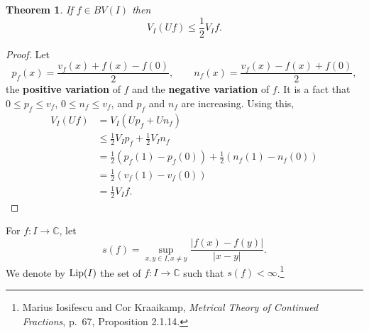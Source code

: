 \documentclass{article}
\newcommand{\Lip}{\ensuremath\mathrm{Lip}}
\newtheorem{theorem}{Theorem}
\theoremstyle{definition}
\begin{document}
\begin{theorem}
If $f \in BV(I)$ then
\[
V_I (Uf) \leq \frac{1}{2} V_I f.
\]
\end{theorem}
\begin{proof}
Let 
\[
p_f(x) = \frac{v_f(x)+f(x)-f(0)}{2},\qquad n_f(x) = \frac{v_f(x)-f(x)+f(0)}{2},
\]
the \textbf{positive variation} of $f$ and the \textbf{negative variation} of $f$.
It is a fact that $0 \leq p_f \leq v_f$, $0 \leq n_f \leq v_f$, 
and $p_f$ and $n_f$ are increasing.
Using this,
\begin{align*}
V_I (Uf)&=V_I(Up_f+Un_f)\\
&\leq \frac{1}{2}V_I p_f + \frac{1}{2} V_I n_f\\
&=\frac{1}{2}(p_f(1)-p_f(0)) + \frac{1}{2}(n_f(1)-n_f(0))\\
&=\frac{1}{2}(v_f(1)-v_f(0))\\
&=\frac{1}{2}V_I f.
\end{align*}
\end{proof}


For $f:I \to \mathbb{C}$,  let
\[
s(f) = \sup_{x,y \in I, x \neq y} \frac{|f(x)-f(y)|}{|x-y|}.
\]
We denote by $\Lip(I)$ the set of $f:I \to \mathbb{C}$ such that $s(f)<\infty$.\footnote{Marius Iosifescu and Cor Kraaikamp,
{\em Metrical Theory of Continued Fractions}, p.~67, Proposition 2.1.14.}
\end{document}
